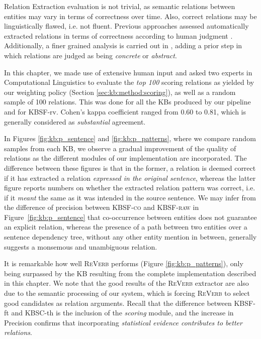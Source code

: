 Relation Extraction evaluation is not trivial, as semantic relations between entities may vary in terms of correctness over time. Also, correct relations may be linguistically flawed, i.e. not fluent. Previous approaches assessed automatically extracted relations in terms of correctness according to human judgment \citep{Fader2011,Mausam2012}. Additionally, a finer grained analysis is carried out in \cite{Bankoetal2007}, adding a prior step in which relations are judged as being \textit{concrete} or \textit{abstract}.

In this chapter, we made use of extensive human input and asked two experts in Computational Linguistics to evaluate the \textit{top 100} scoring relations as yielded by our weighting policy (Section \ref{sec:kb:method:scoring}), as well as a random sample of 100 relations. This was done for all the KBs produced by our pipeline and for \textsc{KBSF}-rv. Cohen's kappa coefficient ranged from 0.60 to 0.81, which is generally considered as \textit{substantial} agreement.


In Figures \ref{fig:kb:p_sentence} and \ref{fig:kb:p_patterns}, where we compare random samples from each KB, we observe a gradual improvement of the quality of relations as the different modules of our implementation are incorporated. The difference between these figures is that in the former, a relation is deemed correct if it has extracted a relation \textit{expressed in the original sentence}, whereas the latter figure reports numbers on whether the extracted relation pattern was correct, i.e. if it \textit{meant} the same as it was intended in the source sentence. We may infer from the difference of precision between \textsc{KBSF-co} and \textsc{KBSF-raw} in Figure~\ref{fig:kb:p_sentence} that co-occurrence between entities does not guarantee an explicit relation, whereas the presence of a path between two entities over a sentence dependency tree, without any other entity mention in between, generally suggests a monsemous and unambiguous relation.

It is remarkable how well \textsc{ReVerb} performs (Figure \ref{fig:kb:p_patterns}), only being surpassed by the KB resulting from the complete implementation described in this chapter. We note that the good results of the \textsc{ReVerb} extractor are also due to the semantic processing of our system, which is forcing \textsc{ReVerb} to select good candidates as relation arguments. Recall that the difference between \textsc{KBSF}-ft and \textsc{KBSC}-th is the inclusion of the \textit{scoring} module, and the increase in Precision confirms that incorporating \textit{statistical evidence contributes to better relations}.


